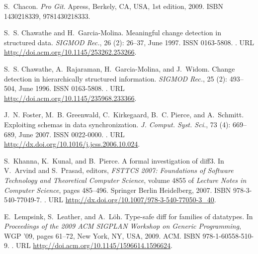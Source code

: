 \documentclass{sigplanconf}
\theoremstyle{plain}
\begin{document}
\begin{thebibliography}{22}
S.~Chacon.
\newblock \emph{Pro Git}.
\newblock Apress, Berkely, CA, USA, 1st edition, 2009.
\newblock ISBN 1430218339, 9781430218333.

S.~S. Chawathe and H.~Garcia-Molina.
\newblock Meaningful change detection in structured data.
\newblock \emph{SIGMOD Rec.}, 26 (2): 26--37, June 1997.
\newblock ISSN 0163-5808.
\newblock {}.
\newblock URL \url{http://doi.acm.org/10.1145/253262.253266}.

S.~S. Chawathe, A.~Rajaraman, H.~Garcia-Molina, and J.~Widom.
\newblock Change detection in hierarchically structured information.
\newblock \emph{SIGMOD Rec.}, 25 (2): 493--504, June 1996.
\newblock ISSN 0163-5808.
\newblock {}.
\newblock URL \url{http://doi.acm.org/10.1145/235968.233366}.

J.~N. Foster, M.~B. Greenwald, C.~Kirkegaard, B.~C. Pierce, and A.~Schmitt.
\newblock Exploiting schemas in data synchronization.
\newblock \emph{J. Comput. Syst. Sci.}, 73 (4): 669--689,
  June 2007.
\newblock ISSN 0022-0000.
\newblock {}.
\newblock URL \url{http://dx.doi.org/10.1016/j.jcss.2006.10.024}.

S.~Khanna, K.~Kunal, and B.~Pierce.
\newblock A formal investigation of diff3.
\newblock In V.~Arvind and S.~Prasad, editors, \emph{FSTTCS 2007: Foundations
  of Software Technology and Theoretical Computer Science}, volume 4855 of
  \emph{Lecture Notes in Computer Science}, pages 485--496. Springer Berlin
  Heidelberg, 2007.
\newblock ISBN 978-3-540-77049-7.
\newblock {}.
\newblock URL \url{http://dx.doi.org/10.1007/978-3-540-77050-3_40}.

E.~Lempsink, S.~Leather, and A.~L\"{o}h.
\newblock Type-safe diff for families of datatypes.
\newblock In \emph{Proceedings of the 2009 ACM SIGPLAN Workshop on Generic
  Programming}, WGP '09, pages 61--72, New York, NY, USA, 2009. ACM.
\newblock ISBN 978-1-60558-510-9.
\newblock {}.
\newblock URL \url{http://doi.acm.org/10.1145/1596614.1596624}.


\end{thebibliography}
\end{document}
